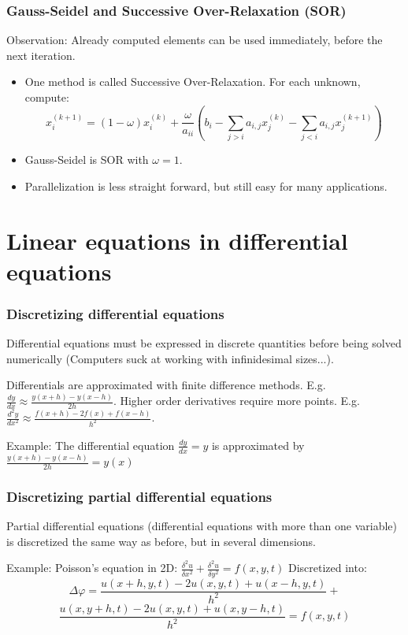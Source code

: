 \begin{frame}
\frametitle{Gauss-Seidel and Successive Over-Relaxation (SOR)}
Observation: Already computed elements can be used immediately, before the next iteration. 
\begin{itemize}
\item One method is called Successive Over-Relaxation. For each unknown, compute:
$$
x_i^{(k+1)} = (1-\omega)x_i^{(k)} + \frac{\omega}{a_{ii}}\left(b_i-\sum_{j > i} a_{i,j}x_j^{(k)}-\sum_{j < i} a_{i,j}x_j^{(k+1)}\right)
$$
\item Gauss-Seidel is SOR with $\omega = 1$.
\item Parallelization is less straight forward, but still easy for many applications.
\end{itemize}

\end{frame}

\section{Linear equations in differential equations}

\begin{frame}
\frametitle{Discretizing differential equations}
Differential equations must be expressed in discrete quantities before being solved numerically (Computers suck at working with infinidesimal sizes...).

Differentials are approximated with finite difference methods. E.g. $\frac{dy}{dx}\approx \frac{y(x+h)-y(x-h)}{2h}$. Higher order derivatives require more points. E.g. $\frac{d^2y}{dx^2}\approx \frac{f(x+h)-2f(x)+f(x-h)}{h^2}$.

Example: The differential equation $\frac{dy}{dx} = y$ is approximated by $\frac{y(x+h)-y(x-h)}{2h} = y(x)$

\end{frame}

\begin{frame}
\frametitle{Discretizing partial differential equations}
Partial differential equations (differential equations with more than one variable) is discretized the same way as before, but in several dimensions.

Example: Poisson's equation in 2D: $\frac{\delta^2 u}{\delta x^2} + \frac{\delta^2 u}{\delta y^2} = f(x,y,t)$
Discretized into:
$$\Delta \varphi =
\frac{u(x+h,y,t)-2u(x,y,t)+u(x-h,y,t)}{h^2} + $$
$$
\frac{u(x,y+h,t)-2u(x,y,t)+u(x,y-h,t)}{h^2} = f(x,y,t)
$$

\end{frame}

